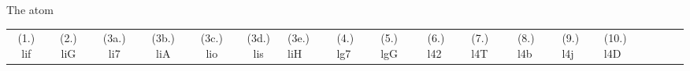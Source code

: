 \begin{eocexercises}{The atom}
 \par \begin{tabular}[h]{cccccc}
 (1.) lif  &  (2.) liG  &  (3a.) li7  &  (3b.) liA  &  (3c.) lio  &  (3d.) lis  &  (3e.) liH  &  (4.) lg7  &  (5.) lgG  &  (6.) l42  &  (7.) l4T  &  (8.) l4b  &  (9.) l4j  &  (10.) l4D  &  & &  & \end{tabular}

\end{eocexercises}
